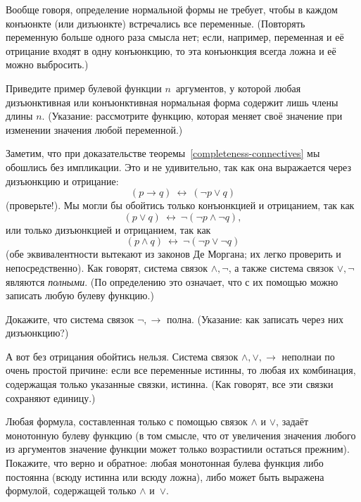 Вообще говоря, определение нормальной формы
не требует, чтобы в каждом конъюнкте (или дизъюнкте)
встречались все переменные. (Повторять переменную больше
одного раза смысла нет; если, например, переменная и её отрицание
входят в одну конъюнкцию, то эта
конъюнкция всегда ложна и её можно
выбросить.)

\begin{problem}
Приведите пример булевой функции $n$~аргументов, у которой любая
дизъюнктивная или конъюнктивная нормальная форма содержит лишь
члены длины $n$. (Указание: рассмотрите функцию, которая меняет
своё значение при изменении значения любой переменной.)
\end{problem}

Заметим, что при доказательстве
теоремы~\ref{completeness-connectives} мы обошлись без импликации.
Это и не удивительно, так
как она выражается через дизъюнкцию и отрицание:
        $$
(p\to q) \ \leftrightarrow \ (\lnot p \lor q)
        $$
(проверьте!). Мы могли бы обойтись
только конъюнкцией и отрицанием, так как
        $$
(p\lor q) \ \leftrightarrow \ \lnot(\lnot p \land \lnot q),
        $$
или только дизъюнкцией и отрицанием, так как
        $$
(p\land q) \ \leftrightarrow \ \lnot(\lnot p \lor \lnot q)
        $$
(обе эквивалентности вытекают из законов Де Моргана; их легко
проверить и непосредственно). Как говорят, система связок
$\land, \lnot$, а также система связок $\lor, \lnot$ являются
\emph{полными}.%
(По определению это означает, что с их помощью
можно записать любую булеву функцию.)

\begin{problem}
Докажите, что система связок $\lnot, \to$ полна.
(Указание: как записать через них дизъюнкцию?)
\end{problem}

А вот без отрицания обойтись нельзя. Система связок $\land,
\lor,\to$ неполна\т и по очень простой причине: если все
переменные истинны, то любая их комбинация, содержащая только
указанные связки, истинна. (Как говорят, все эти связки 
сохраняют единицу.)%

\begin{problem}
Любая формула, составленная только с помощью
связок $\land$ и $\lor$, задаёт монотонную булеву функцию%
%
(в том
смысле, что от увеличения значения любого из аргументов значение
функции может только возрасти\т или остаться прежним). Покажите,
что верно и обратное: любая монотонная булева функция либо постоянна (всюду истинна или всюду ложна), либо может быть выражена формулой,
содержащей только $\land$ и~$\lor$.
\end{problem}

